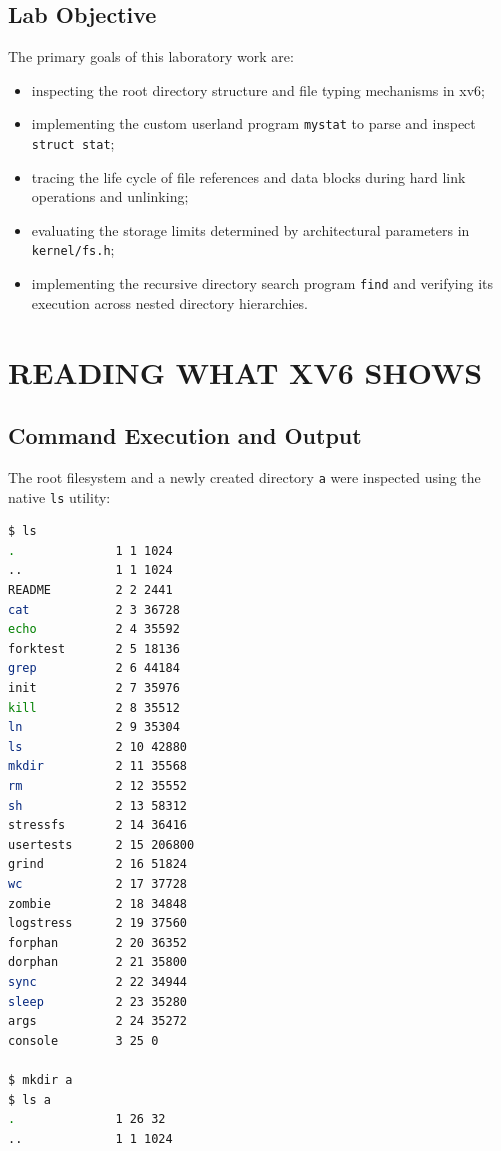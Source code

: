 \documentclass[12pt,a4paper]{report}
\numberwithin{equation}{chapter}
\numberwithin{figure}{chapter}
\numberwithin{table}{chapter}
\begin{document}
\section{Lab Objective}
The primary goals of this laboratory work are:
\begin{itemize}
    \item inspecting the root directory structure and file typing mechanisms in xv6;
    \item implementing the custom userland program \texttt{mystat} to parse and inspect \texttt{struct stat};
    \item tracing the life cycle of file references and data blocks during hard link operations and unlinking;
    \item evaluating the storage limits determined by architectural parameters in \texttt{kernel/fs.h};
    \item implementing the recursive directory search program \texttt{find} and verifying its execution across nested directory hierarchies.
\end{itemize}

\chapter{READING WHAT XV6 SHOWS}

\section{Command Execution and Output}
The root filesystem and a newly created directory \texttt{a} were inspected using the native \texttt{ls} utility:
\begin{lstlisting}[language=bash]
$ ls
.              1 1 1024
..             1 1 1024
README         2 2 2441
cat            2 3 36728
echo           2 4 35592
forktest       2 5 18136
grep           2 6 44184
init           2 7 35976
kill           2 8 35512
ln             2 9 35304
ls             2 10 42880
mkdir          2 11 35568
rm             2 12 35552
sh             2 13 58312
stressfs       2 14 36416
usertests      2 15 206800
grind          2 16 51824
wc             2 17 37728
zombie         2 18 34848
logstress      2 19 37560
forphan        2 20 36352
dorphan        2 21 35800
sync           2 22 34944
sleep          2 23 35280
args           2 24 35272
console        3 25 0

$ mkdir a
$ ls a
.              1 26 32
..             1 1 1024
\end{lstlisting}
\end{document}
